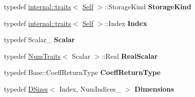 \begin{DoxyCompactItemize}
typedef \hyperlink{struct_eigen_1_1internal_1_1traits}{internal\+::traits}$<$ \hyperlink{class_eigen_1_1_tensor}{Self} $>$\+::Storage\+Kind {\bfseries Storage\+Kind}
\item 
\mbox{\label{class_eigen_1_1_tensor_acce4583bb4ed73c3dd16306c3d96b7f1}} 
typedef \hyperlink{struct_eigen_1_1internal_1_1traits}{internal\+::traits}$<$ \hyperlink{class_eigen_1_1_tensor}{Self} $>$\+::Index {\bfseries Index}
\item 
\mbox{\label{class_eigen_1_1_tensor_ac318cebe653a78f051dca2ea59af9a9f}} 
typedef Scalar\+\_\+ {\bfseries Scalar}
\item 
\mbox{\label{class_eigen_1_1_tensor_abfd26ffd07a60f37e19bca45cdeda709}} 
typedef \hyperlink{group___core___module_struct_eigen_1_1_num_traits}{Num\+Traits}$<$ Scalar $>$\+::Real {\bfseries Real\+Scalar}
\item 
\mbox{\label{class_eigen_1_1_tensor_a81776baaeaadf348a2a7bdb3e76a3d2d}} 
typedef Base\+::\+Coeff\+Return\+Type {\bfseries Coeff\+Return\+Type}
\item 
\mbox{\label{class_eigen_1_1_tensor_a33bb49acaa60106e409577aa9129c978}} 
typedef \hyperlink{struct_eigen_1_1_d_sizes}{D\+Sizes}$<$ Index, Num\+Indices\+\_\+ $>$ {\bfseries Dimensions}
\end{DoxyCompactItemize}
